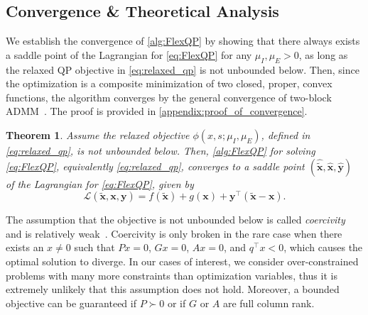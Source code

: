 \documentclass{article} %
\newtheorem{theorem}{Theorem}[section]
\begin{document}
\subsection{Convergence \& Theoretical Analysis}

We establish the convergence of \cref{alg:FlexQP} by showing that there always exists a saddle point of the Lagrangian for \cref{eq:FlexQP} for any $\mu_I, \mu_E > 0$, as long as the relaxed QP objective in \cref{eq:relaxed_qp} is not unbounded below. Then, since the optimization is a composite minimization of two closed, proper, convex functions, the algorithm converges by the general convergence of two-block ADMM~\citep{boyd2011distributed}. The proof is provided in \cref{appendix:proof_of_convergence}.

\begin{theorem} \label{theorem:convergence}
    Assume the relaxed objective $\phi(x, s; \mu_I, \mu_E)$, defined in \cref{eq:relaxed_qp}, is not unbounded below.
    Then, \cref{alg:FlexQP} for solving \cref{eq:FlexQP}, equivalently \cref{eq:relaxed_qp}, converges to a saddle point $(\hat{\tilde{\boldsymbol{x}}}, \hat{\boldsymbol{x}}, \hat{\boldsymbol{y}})$ of the Lagrangian for \cref{eq:FlexQP}, given by
    \begin{equation} \label{eq:flexqp_lagrangian}
        \mathcal{L}(\tilde{\boldsymbol{x}}, \boldsymbol{x}, \boldsymbol{y}) = f(\tilde{\boldsymbol{x}}) + g(\boldsymbol{x}) + \boldsymbol{y}^\top (\tilde{\boldsymbol{x}} - \boldsymbol{x}).
    \end{equation}
\end{theorem}
The assumption that the objective is not unbounded below is called \emph{coercivity} and is relatively weak~\citep{bauschke2017convex}.
Coercivity is only broken in the rare case when there exists an $x \neq 0$ such that $Px = 0$, $Gx = 0$, $Ax = 0$, and $q^\top x < 0$, which causes the optimal solution to diverge.
In our cases of interest, we consider over-constrained problems with many more constraints than optimization variables, thus it is extremely unlikely that this assumption does not hold.
Moreover, a bounded objective can be guaranteed if $P \succ 0$ or if $G$ or $A$ are full column rank.
\end{document}
